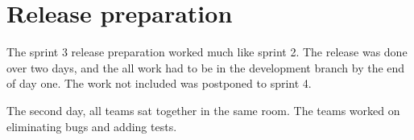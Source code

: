 \section{Release preparation}

The sprint 3 release preparation worked much like sprint 2. The release was done over two days, and the all work had to be in the development branch by the end of day one. The work not included was postponed to sprint 4.

The second day, all teams sat together in the same room. The teams worked on eliminating bugs and adding tests.